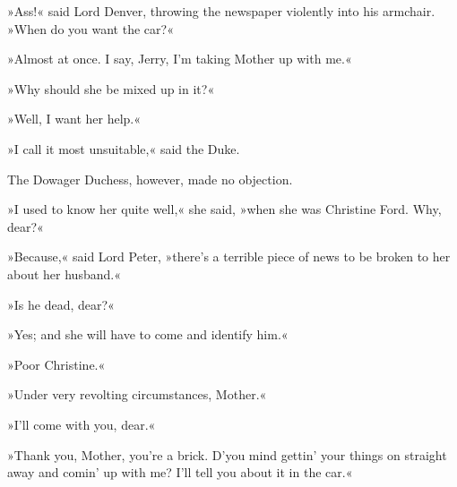»Ass!« said Lord Denver, throwing the newspaper violently into his armchair. »When do you want the car?«

»Almost at once. I say, Jerry, I'm taking Mother up with me.«

»Why should she be mixed up in it?«

»Well, I want her help.«

»I call it most unsuitable,« said the Duke.

The Dowager Duchess, however, made no objection.

»I used to know her quite well,« she said, »when she was Christine Ford. Why, dear?«

»Because,« said Lord Peter, »there's a terrible piece of news to be broken to her about her husband.«

»Is he dead, dear?«

»Yes; and she will have to come and identify him.«

»Poor Christine.«

»Under very revolting circumstances, Mother.«

»I'll come with you, dear.«

»Thank you, Mother, you're a brick. D'you mind gettin' your things on straight away and comin' up with me? I'll tell you about it in the car.«
